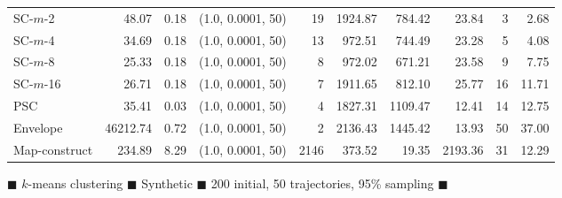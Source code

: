 \begin{figure}
\begin{center}
\begin{minipage}{\textwidth}
{\begin{tabular}{@{}lrrcrrrrrr@{}}
        SC-$m$-2 & 48.07 & 0.18 & (1.0, 0.0001, 50) & 19 & 1924.87 & 784.42 & 23.84 & 3 & 2.68\\
        SC-$m$-4 & 34.69 & 0.18 & (1.0, 0.0001, 50) & 13 & 972.51 & 744.49 & 23.28 & 5 & 4.08\\
        SC-$m$-8 & 25.33 & 0.18 & (1.0, 0.0001, 50) & 8 & 972.02 & 671.21 & 23.58 & 9 & 7.75\\
        SC-$m$-16 & 26.71 & 0.18 & (1.0, 0.0001, 50) & 7 & 1911.65 & 812.10 & 25.77 & 16 & 11.71\\
        PSC & 35.41 & 0.03 & (1.0, 0.0001, 50) & 4 & 1827.31 & 1109.47 & 12.41 & 14 & 12.75\\
        Envelope & 46212.74 & 0.72 & (1.0, 0.0001, 50) & 2 & 2136.43 & 1445.42 & 13.93 & 50 & 37.00\\
        Map-construct & 234.89 & 8.29 & (1.0, 0.0001, 50) & 2146 & 373.52 & 19.35 & 2193.36 & 31 & 12.29\\
        \bottomrule
    \end{tabular}
    }
    \end{minipage}
%
        \caption{$\blacksquare$ $k$-means clustering $\blacksquare$ Synthetic $\blacksquare$ 200 initial, 50 trajectories, 95\% sampling $\blacksquare$}
%
    \end{center} \end{figure}
\clearpage
\newpage 
%
\clearpage
%

